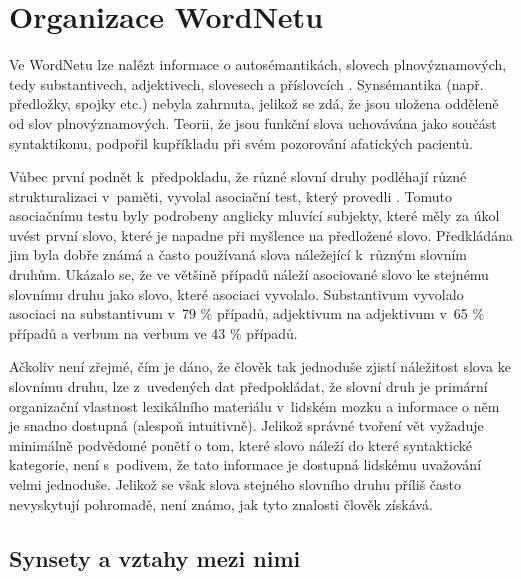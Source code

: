 \documentclass[a4paper,11pt,openany,twoside]{book}
\begin{document}
			\section{Organizace WordNetu}

				Ve WordNetu lze nalézt informace o autosémantikách, slovech plnovýznamových, tedy substantivech, adjektivech, slovesech a příslovcích \parencite{vossen1998introduction}. Synsémantika (např. předložky, spojky etc.) nebyla zahrnuta, jelikož se zdá, že jsou uložena odděleně od slov plnovýznamových. Teorii, že jsou funkční slova uchovávána jako součást syntaktikonu, podpořil kupříkladu \textcite{garrett1982production} při svém pozorování afatických pacientů. 

				Vůbec první podnět k~předpokladu, že různé slovní druhy podléhají různé strukturalizaci v~paměti, vyvolal asociační test, který provedli \textcite{fillenbaum1965grammatical}. Tomuto asociačnímu testu byly podrobeny anglicky mluvící subjekty, které měly za úkol uvést první slovo, které je napadne při myšlence na předložené slovo. Předkládána jim byla dobře známá a často používaná slova náležející k~různým slovním druhům. Ukázalo se, že ve většině případů náleží asociované slovo ke stejnému slovnímu druhu jako slovo, které asociaci vyvolalo. Substantivum vyvolalo asociaci na substantivum v~79 \% případů, adjektivum na adjektivum v~65 \% případů a verbum na verbum ve 43 \% případů. 

				Ačkoliv není zřejmé, čím je dáno, že člověk tak jednoduše zjistí náležitost slova ke slovnímu druhu, lze z~uvedených dat předpokládat, že slovní druh je primární organizační vlastnost lexikálního materiálu v~lidském mozku a informace o něm je snadno dostupná (alespoň intuitivně). Jelikož správné tvoření vět vyžaduje minimálně podvědomé ponětí o tom, které slovo náleží do které syntaktické kategorie, není s~podivem, že tato informace je dostupná lidskému uvažování velmi jednoduše. Jelikož se však slova stejného slovního druhu příliš často nevyskytují pohromadě, není známo, jak tyto znalosti člověk získává. \parencite{fillenbaum1965grammatical, miller1990introduction}

				\subsection{Synsety a vztahy mezi nimi}
				\label{cha:princeton-synset-rels}

\end{document}
